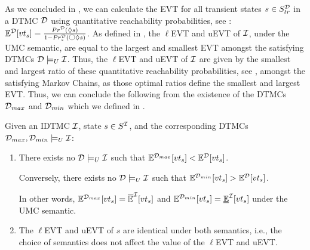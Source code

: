 As we concluded in , we can calculate the EVT for all transient states $s \in S_{tr}^{\mathcal{D}}$ in a DTMC $\mathcal{D}$ using quantitative reachability probabilities, see : $\Exp^\MC[vt_s] = \frac{Pr^\MC(\lozenge s)}{1-Pr^\MC_s(\Circle\lozenge s)}$. As defined in , the $\ell$EVT and uEVT of $\mathcal{I}$, under the UMC semantic, are equal to the largest and smallest EVT amongst the satisfying DTMCs $\mathcal{D} \models_U \mathcal{I}$. Thus, the $\ell$EVT and uEVT of $\mathcal{I}$ are given by the smallest and largest ratio of these quantitative reachability probabilities, see , amongst the satisfying Markov Chains, as those optimal ratios define the smallest and largest EVT. 
Thus, we can conclude the following from the existence of the DTMCs $\mathcal{D}_{max}$ and $\mathcal{D}_{min}$ which we defined in .
\begin{theorem}\label{th:u/lEVTs_via_reach_and_semantics_coincide}
    Given an IDTMC $\mathcal{I}$, state $s\in S^{\mathcal{I}}$, and the corresponding DTMCs $\mathcal{D}_{max},\mathcal{D}_{min}\models_U \mathcal{I}$:
    \begin{enumerate}[label=(\roman*)]
        \item There exists no $\mathcal{D} \models_U \mathcal{I}$ such that $\mathbb{E}^{\mathcal{D}_{max}}[vt_s] < \mathbb{E}^{\mathcal{D}}[vt_s]$.
        
        Conversely, there exists no $\mathcal{D} \models_U \mathcal{I}$ such that $\mathbb{E}^{\mathcal{D}_{min}}[vt_s] > \mathbb{E}^{\mathcal{D}}[vt_s]$. 

        In other words, $\mathbb{E}^{\mathcal{D}_{max}}[vt_s] = \mathbb{\overline{E}}^{\mathcal{I}}[vt_s]$ and $\mathbb{E}^{\mathcal{D}_{min}}[vt_s] = \mathbb{\underline{E}}^{\mathcal{I}}[vt_s]$ under the UMC semantic.

        \item The $\ell$EVT and uEVT of $s$ are identical under both semantics, i.e., the choice of semantics does not affect the value of the $\ell$EVT and uEVT.
    \end{enumerate}
\end{theorem}

